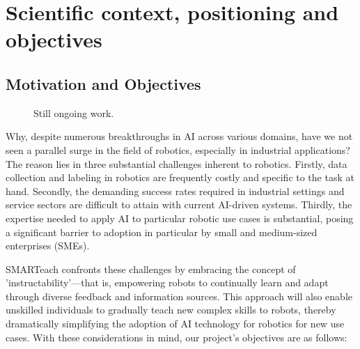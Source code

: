 \documentclass{erc-B2}
\begin{document}
\maketitle
%


\section{Scientific context, positioning and objectives}
 \subsection{Motivation and Objectives}

\begin{figure*}[h]
    \centering
    \resizebox{0.95\textwidth}{!}{}
    \caption{Still ongoing work.
    }
    \label{fig:interfaces}
\end{figure*}

Why, despite numerous breakthroughs in AI across various domains, have we not seen a parallel surge in the field of robotics, especially in industrial applications? The reason lies in three substantial challenges inherent to robotics. Firstly, data collection and labeling in robotics are frequently costly and specific to the task at hand. Secondly, the demanding success rates required in industrial settings and service sectors are difficult to attain with current AI-driven systems. Thirdly, the expertise needed to apply AI to particular robotic use cases is substantial, posing a significant barrier to adoption in particular by small and medium-sized enterprises (SMEs).

SMARTeach confronts these challenges by embracing the concept of 'instructability'—that is, empowering robots to continually learn and adapt through diverse feedback and information sources. This approach will also enable unskilled individuals to gradually teach new complex skills to robots, thereby dramatically simplifying the adoption of AI technology for robotics for new use cases.  With these considerations in mind, our project's objectives are as follows:
\end{document}
